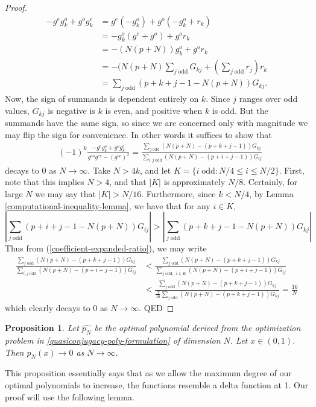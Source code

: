 \documentclass[11pt]{article}
\newtheorem{prop}[thm]{Proposition}
\theoremstyle{definition}
\theoremstyle{remark}
\numberwithin{equation}{section}
\begin{document}
\begin{proof}
\begin{align*}
-g^eg_k^o + g^og_k^e &= g^e(-g^o_k) + g^o(-g^o_k + r_k)\\
&= -g^o_k(g^e+g^o) + g^o r_k\\
&= -(N(p+N))g_k^o + g^or_k\\
&= -(N(p+N)\sum_{j \; \text{odd}} G_{kj} + \left(\sum_{j \; \text{odd}}r_j \right)r_k \\
&= \sum_{j\; \text{odd}} (p+k+j-1 - N(p+N))G_{kj}.
\end{align*}
Now, the sign of summands is dependent entirely on $k$. Since $j$ ranges over odd values, $G_{kj}$ is negative is $k$ is even, and positive when $k$ is odd. But the summands have the same sign, so since we are concerned only with magnitude we may flip the sign for convenience. In other words it suffices to show that
\begin{align}\label{coefficient-expanded-ratio}
&(-1)^k\frac{-g^eg_k^o + g^og_k^e}{g^{oo} g^{ee}-(g^{oe})^2} = \frac{ \sum_{j\; \text{odd}} (N(p+N) -(p+k+j-1))G_{kj}}{ \sum_{i,j \; \text{odd}}  (N(p+N) -(p+i+j-1))G_{ij}}
\end{align}
decays to 0 as $N\to \infty$. Take $N>4k$, and let $K = \{i \; \text{odd}: N/4  \le i \le N/2\}$. First, note that this implies $N>4$, and that $|K|$ is approximately $N/8$. Certainly, for large $N$ we may say that $|K|>N/16$. Furthermore, since $k<N/4$, by Lemma \ref{computational-inequality-lemma}, we have that for any $i\in K$, 
\begin{equation}\label{inequality-sum-of-products} \left|\sum_{j\; \text{odd}} (p+i+j-1 - N(p+N))G_{ij} \right| > \left| \sum_{j\; \text{odd}} (p+k+j-1 - N(p+N))G_{kj} \right|\end{equation}
Thus from (\ref{coefficient-expanded-ratio}), we may write
\begin{align*}
\frac{ \sum_{j\; \text{odd}} (N(p+N) -(p+k+j-1))G_{kj}}{ \sum_{i,j \; \text{odd}}  (N(p+N) -(p+i+j-1))G_{ij}} &< \frac{ \sum_{j\; \text{odd}} (N(p+N) -(p+k+j-1))G_{kj}}{ \sum_{j\; \text{odd, }\; i\in K}  (N(p+N) -(p+i+j-1))G_{ij}}\\
& < \frac{ \sum_{j\; \text{odd}} (N(p+N) -(p+k+j-1))G_{kj}}{\frac{N}{16} \sum_{j \; \text{odd}}  (N(p+N) -(p+k+j-1))G_{kj}} = \frac{16}{N}
\end{align*} which clearly decays to 0 as $N\to \infty$. QED
\end{proof}

\begin{prop}\label{pointwise-convergence-zero-one-function}
Let $\hat{p_N}$ be the optimal polynomial derived from the optimization problem in \ref{quasiconjugacy-poly-formulation} of dimension $N$. Let $x\in (0,1)$. Then $p_N(x) \to 0$ as $N\to \infty$. 
\end{prop}
This proposition essentially says that as we allow the maximum degree of our optimal polynomials to increase, the functions resemble a delta function at 1. Our proof will use the following lemma.
\end{document}
